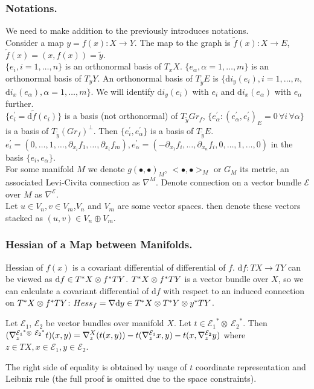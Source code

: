 \documentclass{llncs}
\newcommand{\partderiv}[2]{\partial_{#2} {#1}}
\newcommand{\CovariantDiffManif}[1]{\nabla^{#1}}
\newcommand{\CovariantDerivManif}[2]{\tensor*{\nabla}{^{#1}_{#2}}}
\newcommand{\CovariantDiff}{\nabla}
\newcommand{\Diff}{\mathrm{d}}
\newcommand{\TangentBundle}[1]{T{#1}}
\newcommand{\CotangentBundle}[1]{\tensor*{T}{^{*}}{#1}}
\newcommand {\Preimage}[2]{{#2}^*{#1}}
\newcommand \TPreimage[2]{\Preimage{\TangentBundle{#1}}{#2}}
\newcommand {\DiffSpace}[3]{\CotangentBundle{#1}\otimes \TPreimage{#2}{#3}}
\newcommand {\HessianSpace}[3]{\CotangentBundle{#1}\otimes \CotangentBundle{#2}\otimes \TPreimage{#2}{#3}}
\newcommand {\bigeps}{\mathcal{E}}
\begin{document}
\subsubsection{Notations.}
We need to make addition to the previously introduces notations.
\\
Consider a map $y = f(x):X\to Y$. The map to the graph is
$\tilde{f}(x):X \to E$, $\tilde{f}(x)=(x,f(x))=\tilde{y}$.
\\
$\{e_i, i=1,\dots,n\}$ is an orthonormal basis of $T_x X$. $\{e_\alpha, \alpha=1,\dots,m\}$ is an orthonormal basis of $T_y Y$.
An orthonormal basis of $T_{\tilde{y}} E$ is $\{\Diff i_y(e_i), i=1,\dots,n,$
\\ 
$\Diff i_x(e_\alpha),\alpha=1,\dots,m\}$. We will identify $\Diff i_y(e_i)$ with $e_i$ and $\Diff i_x(e_\alpha)$ with $e_\alpha$ further. 
\\
$\{e_i^{'}=\Diff \tilde{f}(e_i)\}$ is a basis (not orthonormal) of $T_{\tilde{y}} Gr_f$, 
$\{e_\alpha^{'}: (e_\alpha^{'},e_i^{'})_{E} = 0 \,\forall i \, \forall \alpha \}$ is a basis of $T_{\tilde{y}} (Gr_f)^{\bot}$. Then $\{e_i^{'}, e_\alpha^{'}\}$ is a basis of $T_{\tilde{y}} E$. 
\\
$e_i^{'} = (0,\dots,1, \dots, \partderiv{f_1}{x_i}, \dots, \partderiv{f_m}{x_i}), 
e_{\alpha}^{'}=(-\partderiv{f_i}{x_1}, \dots, \partderiv{f_i}{x_n}, 0,\dots,1, \dots,0)$ in the basis $\{e_i, e_\alpha\}$.
\\
For some manifold $M$ we denote $g(∙,∙)_{M}$, $<∙,∙>_{M}$ or $G_M$ its metric, an associated Levi-Civita connection as $\CovariantDiffManif{M}$. Denote connection on a vector bundle $\bigeps$ over $M$ as $\CovariantDiffManif{\bigeps}$. 
\\
Let $u \in V_n, v \in V_m$,$V_n$ and $V_m$ are some vector spaces. then denote these vectors stacked as $(u,v) \in V_n\oplus V_m$.

\subsubsection{Hessian of a Map between Manifolds.}
Hessian of $f(x)$ is a covariant differential of differential of $f$. $\Diff f:TX\to TY$ can be viewed as $\Diff f \in \DiffSpace{X}{Y}{f}$.
$\DiffSpace{X}{Y}{f}$ is a vector bundle over $X$, so we can calculate a covariant differential of $\Diff f$ with respect to an induced connection on $\DiffSpace{X}{Y}{f}$: $Hess_f=\CovariantDiff \Diff y \in \HessianSpace{X}{Y}{y}$.

\begin{lemma} \label{LemCovDiff}
Let $\bigeps_1$, $\bigeps_2$ be vector bundles over manifold $X$. 
Let $t \in {\bigeps_1}^* \otimes \ {\bigeps_2}^*$. Then
$(\CovariantDerivManif{{\bigeps_1}^* \otimes \ {\bigeps_2}^*}{z}{t})(x, y) = 
\CovariantDerivManif{X}{z}{(t(x, y))} -
t(\CovariantDerivManif{\bigeps_1}{z}{x}, y) - 
t(x, \CovariantDerivManif{\bigeps_2}{z}{y})$
where $z \in TX, x \in \bigeps_1, y \in \bigeps_2$. 
\end{lemma}
The right side of equality is obtained by usage of $t$ coordinate representation and Leibniz rule (the full proof is omitted due to the space constraints).
\end{document}
